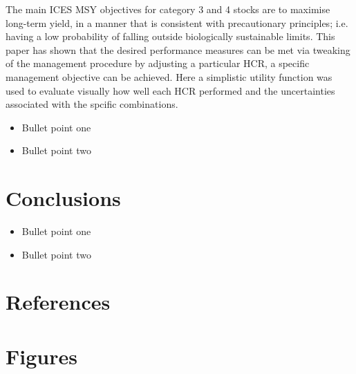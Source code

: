 \documentclass[preprint,12pt]{elsarticle}
\begin{document}
The main ICES MSY objectives for category 3 and 4 stocks are to maximise long-term yield, in a manner that is consistent with precautionary principles; i.e. having a low probability of falling outside biologically sustainable limits.  This paper has shown that the desired performance measures can be met via tweaking of the management procedure by adjusting a particular HCR, a specific management objective can be achieved. Here a simplistic utility function was used to evaluate visually how well each HCR performed and the uncertainties associated with the spcific combinations.



\begin{itemize}
\item Bullet point one
\item Bullet point two
\end{itemize}

\section{Conclusions}


\begin{itemize}
\item Bullet point one
\item Bullet point two
\end{itemize}

\section{References}


 

\section{Figures}
\end{document}
